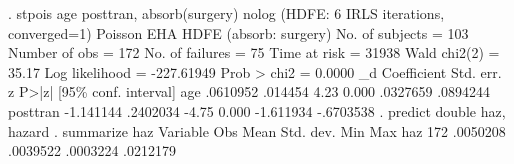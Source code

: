 . stpois age posttran, absorb(surgery) nolog
  (HDFE: 6 IRLS iterations, converged=1)
{\smallskip}
Poisson EHA {\EMDASH} HDFE (absorb: surgery)
{\smallskip}
No. of subjects =          103                  Number of obs   =      172
No. of failures =           75
Time at risk    =        31938                  Wald chi2(2)    =    35.17
Log likelihood  =   -227.61949                  Prob > chi2     =   0.0000
{\smallskip}
          _d {\VBAR} Coefficient  Std. err.      z    P>|z|     [95\% conf. interval]
         age {\VBAR}   .0610952    .014454     4.23   0.000     .0327659    .0894244
    posttran {\VBAR}  -1.141144   .2402034    -4.75   0.000    -1.611934   -.6703538
{\smallskip}
. predict double haz, hazard
{\smallskip}
. summarize haz
{\smallskip}
    Variable {\VBAR}        Obs        Mean    Std. dev.       Min        Max
         haz {\VBAR}        172    .0050208    .0039522   .0003224   .0212179
{\smallskip}
